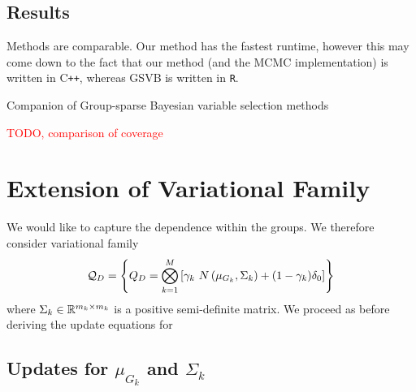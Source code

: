 \documentclass[12pt]{article}
\renewcommand{\red}[1]{\textcolor{red}{#1}}
\begin{document}
\subsection{Results}

Methods are comparable. Our method has the fastest runtime, however this may come down to the fact that our method (and the MCMC implementation) is written in C\texttt{++}, whereas GSVB is written in \texttt{R}.

\begin{table}[htp]
    \centering
    
    \caption{Companion of Group-sparse Bayesian variable selection methods}
    \label{tab:bvs_comprison}
\end{table}

\red{TODO, comparison of coverage}


\newpage
\section{Extension of Variational Family}

We would like to capture the dependence within the groups. We therefore consider variational family
\begin{equation}
    \mathcal{Q}_D = \left\{ Q_D =  \bigotimes_{k=1}^M \left[ 
    \gamma_k\ N\left(\mu_{G_k}, \Sigma_k \right) + (1-\gamma_k) \delta_0 \right] \right\}
\end{equation}
where $\Sigma_k \in \mathbb{R}^{m_k \times m_k}$ is a positive semi-definite matrix. We proceed as before deriving the update equations for 

\subsection{Updates for $\mu_{G_k}$ and $\Sigma_{k}$}
\end{document}
